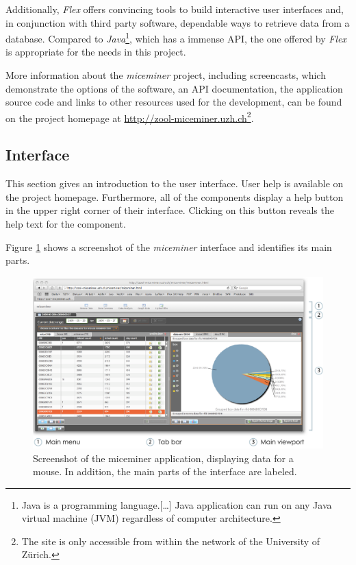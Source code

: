 Additionally, \textit{Flex} offers convincing tools to build interactive user interfaces and, in conjunction with third party software, dependable ways to retrieve data from a database. Compared to \textit{Java}\footnote{Java is a programming language.[\ldots] Java application can run on any Java virtual machine (JVM) regardless of computer architecture\cite{wiki:java}.}, which has a immense \ac{API}, the one offered by \textit{Flex} is appropriate for the needs in this project.

More information about the \textit{miceminer} project, including screencasts, which demonstrate the options of the software, an \ac{API} documentation, the application source code and links to other resources used for the development, can be found on the project homepage at \href{http://zool-miceminer.uzh.ch/}{http://zool-miceminer.uzh.ch}\footnote{The site is only accessible from within the network of the University of Z\"urich.}. 

\subsection{Interface}
\label{subsec:miceminer_interface}

This section gives an introduction to the user interface. User help is available on the project homepage. Furthermore, all of the components display a help button in the upper right corner of their interface. Clicking on this button reveals the help text for the component.

Figure \ref{fig:interface_overview} shows a screenshot of the \textit{miceminer} interface and identifies its main parts.

\begin{figure}[!ht]
\begin{center}
  \includegraphics[width=\textwidth]{assets/pdf/interface_overview.pdf}
  \caption[miceminer interface overview]{Screenshot of the miceminer application, displaying data for a mouse. In addition, the main parts of the interface are labeled.}
  \label{fig:interface_overview}
\end{center}
\end{figure}

